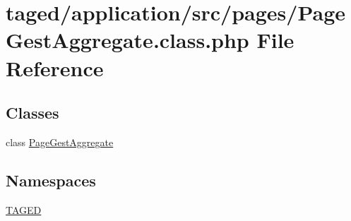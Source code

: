 \hypertarget{_page_gest_aggregate_8class_8php}{}\section{taged/application/src/pages/\+Page\+Gest\+Aggregate.class.\+php File Reference}
\label{_page_gest_aggregate_8class_8php}
\subsection*{Classes}
\begin{DoxyCompactItemize}
\item 
class \hyperlink{class_page_gest_aggregate}{Page\+Gest\+Aggregate}
\end{DoxyCompactItemize}
\subsection*{Namespaces}
\begin{DoxyCompactItemize}
\item 
 \hyperlink{namespace_t_a_g_e_d}{T\+A\+G\+ED}
\end{DoxyCompactItemize}
